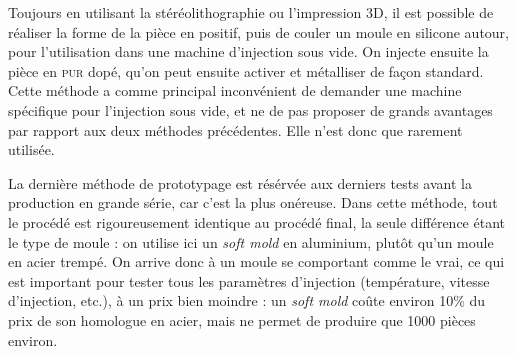 Toujours en utilisant la stéréolithographie ou l'impression 3D, il est possible de réaliser la forme de la pièce en positif, puis de couler un moule en silicone autour, pour l'utilisation dans une machine d'injection sous vide.
On injecte ensuite la pièce en \textsc{pur} dopé, qu'on peut ensuite activer et métalliser de façon standard.
Cette méthode a comme principal inconvénient de demander une machine spécifique pour l'injection sous vide, et ne de pas proposer de grands avantages par rapport aux deux méthodes précédentes.
Elle n'est donc que rarement utilisée.

La dernière méthode de prototypage est résérvée aux derniers tests avant la production en grande série, car c'est la plus onéreuse.
Dans cette méthode, tout le procédé est rigoureusement identique au procédé final, la seule différence étant le type de moule : on utilise ici un \textit{soft mold} en aluminium, plutôt qu'un moule en acier trempé.
On arrive donc à un moule se comportant comme le vrai, ce qui est important pour tester tous les paramètres d'injection (température, vitesse d'injection, etc.), à un prix bien moindre : un \textit{soft mold} coûte environ 10\% du prix de son homologue en acier, mais ne permet de produire que 1000 pièces environ.
